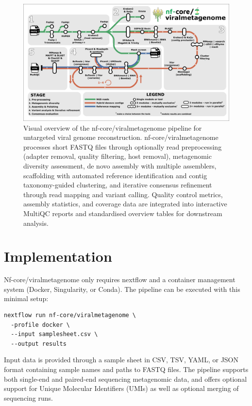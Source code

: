 \begin{figure}[htbp]
    \centering
    \includegraphics[width=1\textwidth]{Fig/fig1.png}
    \caption{Visual overview of the nf-core/viralmetagenome pipeline for untargeted viral genome reconstruction. nf-core/viralmetagenome processes short FASTQ files through optionally read preprocessing (adapter removal, quality filtering, host removal), metagenomic diversity assessment, de novo assembly with multiple assemblers, scaffolding with automated reference identification and contig taxonomy-guided clustering, and iterative consensus refinement through read mapping and variant calling. Quality control metrics, assembly statistics, and coverage data are integrated into interactive MultiQC reports and standardised overview tables for downstream analysis.}
    \label{fig:pipeline-workflow}
\end{figure}

\section{Implementation}

Nf-core/viralmetagenome only requires nextflow and a container management system (Docker, Singularity, or Conda). The pipeline can be executed with this minimal setup:

\begin{verbatim}
nextflow run nf-core/viralmetagenome \
  -profile docker \
  --input samplesheet.csv \
  --output results
\end{verbatim}

Input data is provided through a sample sheet in CSV, TSV, YAML, or JSON format containing sample names and paths to FASTQ files. The pipeline supports both single-end and paired-end sequencing metagenomic data, and offers optional support for Unique Molecular Identifiers (UMIs) as well as optional merging of sequencing runs.

